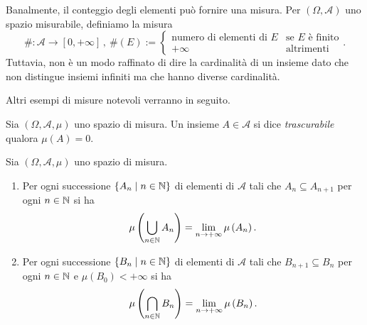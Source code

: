 \begin{esempio}
Banalmente, il conteggio degli elementi può fornire una misura. Per \((\Omega, \mathcal A)\) uno spazio misurabile, definiamo la misura
\[\# : \mathcal A \to [0, +\infty]\,, \ \#(E) := \begin{cases} \text{numero di elementi di } E & \text{se \(E\) è finito} \\ +\infty & \text{altrimenti} \end{cases} .\]
Tuttavia, non è un modo raffinato di dire la cardinalità di un insieme dato che non distingue insiemi infiniti ma che hanno diverse cardinalità.
\end{esempio}

Altri esempi di misure notevoli verranno in seguito.

\begin{definizione}
Sia \((\Omega, \mathcal A, \mu)\) uno spazio di misura. Un insieme \(A \in \mathcal A\) si dice {\em trascurabile}  qualora \(\mu(A) = 0\).
\end{definizione}

\begin{lemma}\label{lemma:LimitOfMeasures}
Sia \((\Omega, \mathcal A, \mu)\) uno spazio di misura.
\begin{enumerate}
\item Per ogni successione \(\left\{A_n \mid n \in \mathbb N\right\}\) di elementi di \(\mathcal A\) tali che \(A_n \subseteq A_{n+1}\) per ogni \(n \in \mathbb N\) si ha
\[\mu \left( \bigcup_{n \in \mathbb N} A_n \right) = \lim_{n \to +\infty} \mu\left(A_n\right) .\]
\item Per ogni successione \(\left\{B_n \mid n \in \mathbb N\right\}\) di elementi di \(\mathcal A\) tali che \(B_{n+1} \subseteq B_n\) per ogni \(n \in \mathbb N\) e \(\mu \left( B_0 \right) < +\infty\) si ha
\[\mu \left( \bigcap_{n \in \mathbb N} B_n \right) = \lim_{n \to +\infty} \mu \left( B_n \right) .\]
\end{enumerate}
\end{lemma}

